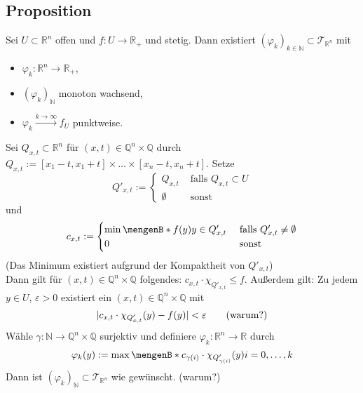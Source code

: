 \subsection[Proposition: Stetige Funktionen lassen sich durch Treppenfunktionen approximieren]{Proposition} %
\label{sub:49}
Sei $U \subset \mathds{R}^n$ offen und $f : U \to \mathds{R}_+$ und stetig. Dann existiert $(\varphi_k)_{k \in \mathds{N}} \subset \mathcal{T}_{\mathds{R}^n}$ mit
\begin{itemize}
	\item $\varphi_k : \mathds{R}^n \to \mathds{R}_+$,
	\item $(\varphi_k)_\mathds{N}$ monoton wachsend,
	\item $\varphi_k \xrightarrow{k \to \infty}  f_U$ punktweise.
\end{itemize}
Sei $Q_{x,t} \subset \mathds{R}^n$ für $(x,t) \in \mathds{Q}^n \times \mathds{Q}$ durch $Q_{x,t} := [x_1 -t, x_1 +t] \times \ldots \times [x_n -t, x_n +t]$. Setze
\[
	Q'_{x,t} := \begin{cases}
		Q_{x,t} &\text{ falls } Q_{x,t} \subset U\\
		\emptyset  &\text{ sonst}
	\end{cases}
\]
und
\[
	c_{x,t} := \begin{cases}
		\min \set[f(y)]{y \in Q'_{x,t}}  &\text{ falls }Q'_{x,t} \not=\emptyset \\
		0 &\text{ sonst}
	\end{cases}
\]
(Das Minimum existiert aufgrund der Kompaktheit von $Q'_{x,t}$)\\
Dann gilt für $(x,t) \in \mathds{Q}^n \times \mathds{Q}$ folgendes: $c_{x,t} \cdot \chi_{Q'_{x,t}} \le f$. Außerdem gilt: Zu jedem $y \in U$, $\varepsilon>0$ existiert ein
$(x,t) \in \mathds{Q}^n \times \mathds{Q}$ mit 
\begin{align*}
	\lvert c_{x,t} \cdot \chi_{Q'_{x,t}}(y) - f(y)\rvert < \varepsilon \tag{warum?} 
\end{align*}
Wähle $\gamma : \mathds{N} \to \mathds{Q}^n \times \mathds{Q}$ surjektiv und definiere $\varphi_k : \mathds{R}^n \to \mathds{R}$ durch 
\[
	\varphi_k (y) := \max \set[c_{\gamma(i)} \cdot \chi_{Q'_{\gamma(i)}}(y)]{i = 0, \ldots , k} 
\]
Dann ist $(\varphi_k)_\mathds{N} \subset \mathcal{T}_{\mathds{R}^n}$ wie gewünscht. \hfill (warum?)

